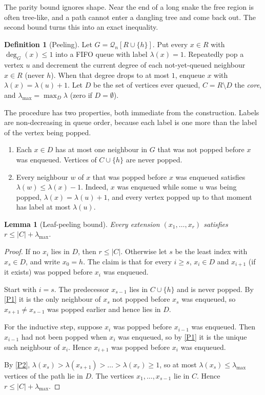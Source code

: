 \documentclass[11pt,a4paper]{article}
\newtheorem{lemma}[theorem]{Lemma}
\theoremstyle{definition}
\newtheorem{definition}[theorem]{Definition}
\newcommand{\Q}{\mathcal{Q}}
\begin{document}
The parity bound ignores shape. Near the end of a long snake the free region is often tree-like, and a path cannot enter a dangling tree and come back out. The second bound turns this into an exact inequality.

\begin{definition}[Peeling]\label{def:peel}
Let $G=\Q_n[R\cup\{h\}]$. Put every $x\in R$ with $\deg_G(x)\le1$ into a FIFO queue with label $\lambda(x)=1$. Repeatedly pop a vertex $u$ and decrement the current degree of each not-yet-queued neighbour $x\in R$ (never $h$). When that degree drops to at most $1$, enqueue $x$ with $\lambda(x)=\lambda(u)+1$. Let $D$ be the set of vertices ever queued, $C=R\setminus D$ the \emph{core}, and $\lambda_{\max}=\max_D\lambda$ (zero if $D=\emptyset$).
\end{definition}

The procedure has two properties, both immediate from the construction. Labels are non-decreasing in queue order, because each label is one more than the label of the vertex being popped.
\begin{enumerate}[label=(P\arabic*),leftmargin=*]
\item\label{P1} Each $x\in D$ has at most one neighbour in $G$ that was not popped before $x$ was enqueued. Vertices of $C\cup\{h\}$ are never popped.
\item\label{P2} Every neighbour $w$ of $x$ that was popped before $x$ was enqueued satisfies $\lambda(w)\le\lambda(x)-1$. Indeed, $x$ was enqueued while some $u$ was being popped, $\lambda(x)=\lambda(u)+1$, and every vertex popped up to that moment has label at most $\lambda(u)$.
\end{enumerate}

\begin{lemma}[Leaf-peeling bound]\label{lem:peel}
Every extension $(x_1,\dots,x_r)$ satisfies $r\le |C|+\lambda_{\max}$.
\end{lemma}

\begin{proof}
If no $x_i$ lies in $D$, then $r\le|C|$. Otherwise let $s$ be the least index with $x_s\in D$, and write $x_0=h$. The claim is that for every $i\ge s$, $x_i\in D$ and $x_{i+1}$ (if it exists) was popped before $x_i$ was enqueued.

Start with $i=s$. The predecessor $x_{s-1}$ lies in $C\cup\{h\}$ and is never popped. By \ref{P1} it is the only neighbour of $x_s$ not popped before $x_s$ was enqueued, so $x_{s+1}\ne x_{s-1}$ was popped earlier and hence lies in $D$.

For the inductive step, suppose $x_i$ was popped before $x_{i-1}$ was enqueued. Then $x_{i-1}$ had not been popped when $x_i$ was enqueued, so by \ref{P1} it is the unique such neighbour of $x_i$. Hence $x_{i+1}$ was popped before $x_i$ was enqueued.

By \ref{P2}, $\lambda(x_{s})>\lambda(x_{s+1})>\dots>\lambda(x_r)\ge1$, so at most $\lambda(x_s)\le\lambda_{\max}$ vertices of the path lie in $D$. The vertices $x_1,\dots,x_{s-1}$ lie in $C$. Hence $r\le|C|+\lambda_{\max}$.
\end{proof}
\end{document}
